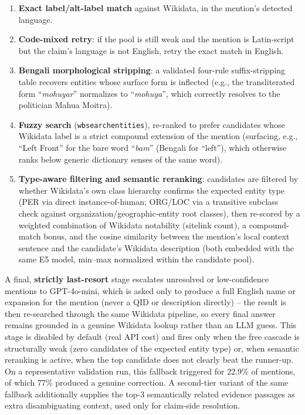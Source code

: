 \documentclass[
]{ceurart}
\begin{document}
\begin{enumerate}
  \item \textbf{Exact label/alt-label match} against Wikidata, in the
    mention's detected language.
  \item \textbf{Code-mixed retry}: if the pool is still weak and the
    mention is Latin-script but the claim's language is not English,
    retry the exact match in English.
  \item \textbf{Bengali morphological stripping}: a validated four-rule
    suffix-stripping table recovers entities whose surface form is
    inflected (e.g., the transliterated form ``\emph{mohuyar}''
    normalizes to ``\emph{mohuya}'', which correctly resolves to the
    politician Mahua Moitra).
  \item \textbf{Fuzzy search} (\texttt{wbsearchentities}), re-ranked to
    prefer candidates whose Wikidata label is a strict compound
    extension of the mention (surfacing, e.g., ``Left Front'' for the
    bare word ``\emph{bam}'' (Bengali for ``left''), which otherwise
    ranks below generic dictionary senses of the same word).
  \item \textbf{Type-aware filtering and semantic reranking}:
    candidates are filtered by whether Wikidata's own class hierarchy
    confirms the expected entity type (PER via direct
    instance-of-human; ORG/LOC via a transitive subclass check against
    organization/geographic-entity root classes), then re-scored by a
    weighted combination of Wikidata notability (sitelink count), a
    compound-match bonus, and the cosine similarity between the
    mention's local context sentence and the candidate's Wikidata
    description (both embedded with the same E5 model, min--max
    normalized within the candidate pool).
\end{enumerate}

A final, \textbf{strictly last-resort} stage escalates unresolved or
low-confidence mentions to GPT-4o-mini, which is asked only to produce a
full English name or expansion for the mention (never a QID or
description directly) -- the result is then re-searched through the
same Wikidata pipeline, so every final answer remains grounded in a
genuine Wikidata lookup rather than an LLM guess. This stage is disabled
by default (real API cost) and fires only when the free cascade is
structurally weak (zero candidates of the expected entity type) or,
when semantic reranking is active, when the top candidate does not
clearly beat the runner-up. On a representative validation run, this
fallback triggered for 22.9\% of mentions, of which 77\% produced a
genuine correction. A second-tier variant of the same fallback
additionally supplies the top-3 semantically related evidence passages
as extra disambiguating context, used only for claim-side resolution.
\end{document}
